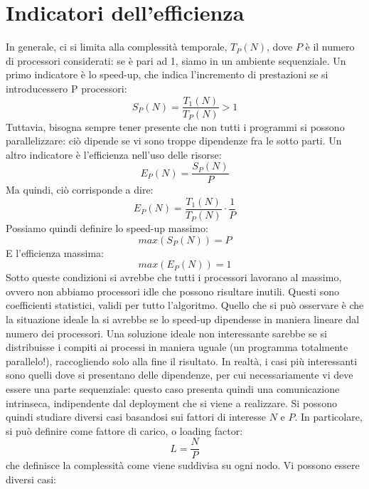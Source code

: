 \section{Indicatori dell'efficienza}
In generale, ci si limita alla complessità temporale, $T_P(N)$, dove $P$ è il numero di processori considerati: se è
pari ad 1, siamo in un ambiente sequenziale.
Un primo indicatore è lo speed-up, che indica l'incremento di prestazioni se si introducessero P processori:
\begin{equation}
S_P(N) = \frac{T_1(N)}{T_P(N)} > 1
\end{equation}
Tuttavia, bisogna sempre tener presente che non tutti i programmi si possono
parallelizzare: ciò dipende se vi sono troppe dipendenze fra le sotto parti.
Un altro indicatore è l'efficienza nell'uso delle risorse:
\begin{equation}
 E_P(N) = \frac{S_P(N)}{P}
\end{equation}
Ma quindi, ciò corrisponde a dire:
\begin{equation}
 E_P(N) = \frac{T_1(N)}{T_P(N)} \cdot \frac{1}{P}
\end{equation}
Possiamo quindi definire lo speed-up massimo:
\begin{equation}
 max(S_P(N)) = P
\end{equation}
E l'efficienza massima:
\begin{equation}
 max(E_P(N)) = 1
\end{equation}
Sotto queste condizioni si avrebbe che tutti i processori lavorano al massimo, ovvero non abbiamo processori idle che
possono risultare inutili. Questi sono coefficienti statistici, validi per tutto l'algoritmo. Quello che si può
osservare è che la situazione ideale la si avrebbe se lo speed-up dipendesse in maniera lineare dal numero dei
processori. Una soluzione ideale non interessante sarebbe se si distribuisse i compiti ai processi in maniera uguale (un
programma totalmente parallelo!), raccogliendo solo alla fine il risultato. In realtà, i casi più interessanti sono
quelli dove si presentano delle dipendenze, per cui necessariamente vi deve essere una parte sequenziale: questo caso
presenta quindi una comunicazione intrinseca, indipendente dal deployment che si viene a realizzare.
Si possono quindi studiare diversi casi basandosi sui fattori di interesse $N$ e $P$. In particolare, si può definire
come fattore di carico, o loading factor:
\begin{equation}
 L = \frac{N}{P}
\end{equation}
che definisce la complessità come viene suddivisa su ogni nodo. Vi possono essere diversi casi:
